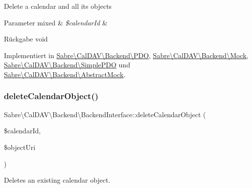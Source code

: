 Delete a calendar and all its objects


\begin{DoxyParams}[1]{Parameter}
mixed & {\em \$calendar\+Id} & \\
\hline
\end{DoxyParams}
\begin{DoxyReturn}{Rückgabe}
void 
\end{DoxyReturn}


Implementiert in \mbox{\hyperlink{class_sabre_1_1_cal_d_a_v_1_1_backend_1_1_p_d_o_a8742e2649f87b0e66d9899decd6b0184}{Sabre\textbackslash{}\+Cal\+D\+A\+V\textbackslash{}\+Backend\textbackslash{}\+P\+DO}}, \mbox{\hyperlink{class_sabre_1_1_cal_d_a_v_1_1_backend_1_1_mock_a8d4df88fced9cb5dadb5f35c13752277}{Sabre\textbackslash{}\+Cal\+D\+A\+V\textbackslash{}\+Backend\textbackslash{}\+Mock}}, \mbox{\hyperlink{class_sabre_1_1_cal_d_a_v_1_1_backend_1_1_simple_p_d_o_ab183f12a8eaa7ac0dbbcd2b17ddf56ac}{Sabre\textbackslash{}\+Cal\+D\+A\+V\textbackslash{}\+Backend\textbackslash{}\+Simple\+P\+DO}} und \mbox{\hyperlink{class_sabre_1_1_cal_d_a_v_1_1_backend_1_1_abstract_mock_aedd71ef0fb853eb8159e273ecc90f909}{Sabre\textbackslash{}\+Cal\+D\+A\+V\textbackslash{}\+Backend\textbackslash{}\+Abstract\+Mock}}.

\mbox{\label{interface_sabre_1_1_cal_d_a_v_1_1_backend_1_1_backend_interface_a2bb33e6316187c3254fe38d3cf61e416}} 
\subsubsection{\texorpdfstring{delete\+Calendar\+Object()}{deleteCalendarObject()}}
{\footnotesize\ttfamily Sabre\textbackslash{}\+Cal\+D\+A\+V\textbackslash{}\+Backend\textbackslash{}\+Backend\+Interface\+::delete\+Calendar\+Object (\begin{DoxyParamCaption}\item[{}]{\$calendar\+Id,  }\item[{}]{\$object\+Uri }\end{DoxyParamCaption})}

Deletes an existing calendar object.


